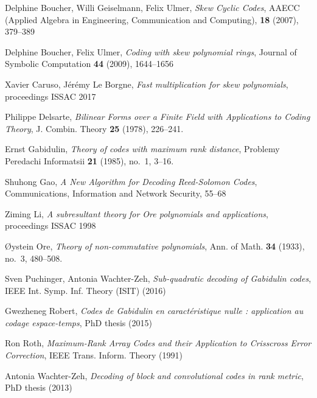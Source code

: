 \documentclass[a4paper]{llncs}
\begin{document}
\begin{thebibliography}{99}
  Delphine Boucher, Willi Geiselmann, Felix Ulmer,
  \emph{Skew Cyclic Codes},
  AAECC (Applied Algebra in Engineering, Communication and Computing), 
  \textbf{18} (2007), 379--389

  Delphine Boucher, Felix Ulmer,
  \emph{Coding with skew polynomial rings},
  Journal of Symbolic Computation \textbf{44} (2009), 1644--1656

  Xavier Caruso, Jérémy Le Borgne,
  \emph{Fast multiplication for skew polynomials},
  proceedings ISSAC 2017

  Philippe Delsarte, 
  \emph{Bilinear Forms over a Finite Field with Applications to Coding Theory},
  J. Combin. Theory \textbf{25} (1978), 226--241.

  Ernst Gabidulin,
  \emph{Theory of codes with maximum rank distance},
  Problemy Peredachi Informatsii \textbf{21} (1985), no.~1, 3--16.

  Shuhong Gao,
  \emph{A New Algorithm for Decoding Reed-Solomon Codes},
  Communications, Information and Network Security, 55--68

  Ziming Li,
  \emph{A subresultant theory for Ore polynomials and applications},
  proceedings ISSAC 1998

  Øystein Ore,
  \emph{Theory of non-commutative polynomials},
  Ann. of Math. \textbf{34} (1933), no.~3, 480--508.

  Sven Puchinger, Antonia Wachter-Zeh,
  \emph{Sub-quadratic decoding of Gabidulin codes}, 
  IEEE Int. Symp. Inf. Theory (ISIT) (2016)

  Gwezheneg Robert,
  \emph{Codes de Gabidulin en caractéristique nulle : application au codage espace-temps},
  PhD thesis (2015)

  Ron Roth, 
  \emph{Maximum-Rank Array Codes and their Application to Crisscross Error Correction}, 
  IEEE Trans. Inform. Theory (1991)

  Antonia Wachter-Zeh,
  \emph{Decoding of block and convolutional codes in rank metric},
  PhD thesis (2013)

\end{thebibliography}
\end{document}

